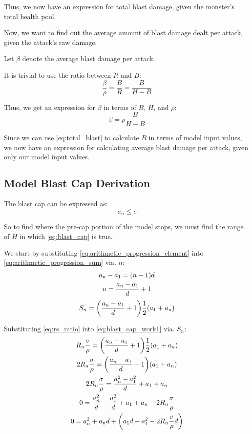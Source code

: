\documentclass{article}
\begin{document}
Thus, we now have an expression for total blast damage, given the monster's total health pool.

Now, we want to find out the average amount of blast damage dealt per attack, given the attack's raw damage.

Let $\beta$ denote the average blast damage per attack.

It is trivial to use the ratio between $R$ and $B$:
\begin{equation}
    \frac{\beta}{\rho}
    = \frac{B}{R}
    = \frac{B}{H - B} 
\end{equation}

Thus, we get an expression for $\beta$ in terms of $B$, $H$, and $\rho$:
\begin{equation}
    \beta = \rho \frac{B}{H - B}
\end{equation}

Since we can use \eqref{eq:total_blast} to calculate $B$ in terms of model input values, we now have an expression for calculating average blast damage per attack, given only our model input values.


\subsection{Model Blast Cap Derivation}%
\label{sub:model_blast_cap_derivation}

The blast cap can be expressed as:
\begin{equation}
    a_n \le c
    \label{eq:blast_cap}
\end{equation}

So to find where the pre-cap portion of the model stops, we must find the range of $H$ in which \eqref{eq:blast_cap} is true.

We start by substituting \eqref{eq:arithmetic_progression_element} into \eqref{eq:arithmetic_progression_sum} via. $n$:
\begin{gather}
    a_n - a_1 = \parens*{n - 1} d \\
    n = \frac{a_n - a_1}{d} + 1
\end{gather}
\begin{equation}
    S_n = \parens*{\frac{a_n - a_1}{d} + 1} \frac{1}{2} \parens*{a_1 + a_n}
    \label{eq:blast_cap_work1}
\end{equation}

Substituting \eqref{eq:rs_ratio} into \eqref{eq:blast_cap_work1} via. $S_n$:
\begin{gather}
    R_n \frac{\sigma}{\rho} = \parens*{\frac{a_n - a_1}{d} + 1} \frac{1}{2} \parens*{a_1 + a_n}
    \\
    2 R_n \frac{\sigma}{\rho} = \parens*{\frac{a_n - a_1}{d} + 1} \parens*{a_1 + a_n}
    \\
    2 R_n \frac{\sigma}{\rho} = \frac{a_n^2 - a_1^2}{d} + a_1 + a_n
    \\
    0 = \frac{a_n^2}{d} - \frac{a_1^2}{d} + a_1 + a_n - 2 R_n \frac{\sigma}{\rho}
    \\
    0 = a_n^2 + a_n d + \parens*{a_1 d - a_1^2 - 2 R_n \frac{\sigma}{\rho} d}
\end{gather}
\end{document}
